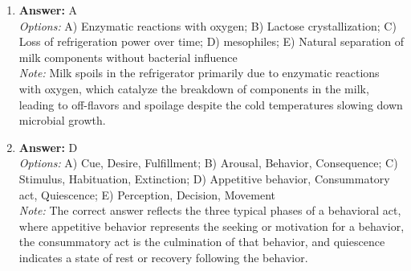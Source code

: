 \documentclass[12pt]{article}
\begin{document}
\begin{enumerate}[label=\arabic*.]
\item \textbf{Answer:} A
\\ \textit{Options:} A) Enzymatic reactions with oxygen; B) Lactose crystallization; C) Loss of refrigeration power over time; D) mesophiles; E) Natural separation of milk components without bacterial influence
\\ \textit{Note:} Milk spoils in the refrigerator primarily due to enzymatic reactions with oxygen, which catalyze the breakdown of components in the milk, leading to off-flavors and spoilage despite the cold temperatures slowing down microbial growth.
\item \textbf{Answer:} D
\\ \textit{Options:} A) Cue, Desire, Fulfillment; B) Arousal, Behavior, Consequence; C) Stimulus, Habituation, Extinction; D) Appetitive behavior, Consummatory act, Quiescence; E) Perception, Decision, Movement
\\ \textit{Note:} The correct answer reflects the three typical phases of a behavioral act, where appetitive behavior represents the seeking or motivation for a behavior, the consummatory act is the culmination of that behavior, and quiescence indicates a state of rest or recovery following the behavior.
\end{enumerate}
\end{document}
